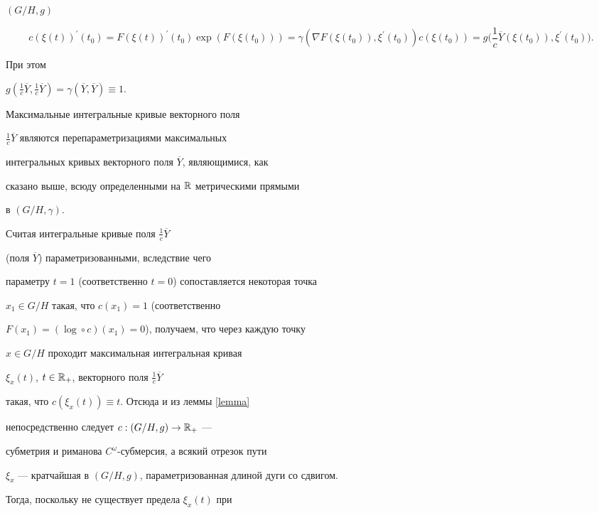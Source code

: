 \begin{pf}
\begin{pf}
$(G/H,g)$


$$


c(\xi(t))^{\prime}(t_{0})=F(\xi(t))^{\prime}(t_{0})\exp(F(\xi(t_{0})))=


\gamma(\nabla F(\xi(t_{0})),\xi^{\prime}(t_{0}))c(\xi(t_{0}))=


g\bigg(\frac{1}{c}\overline{Y}(\xi(t_{0})),\xi^{\prime}(t_{0})\bigg).


$$


При этом


$g(\frac{1}{c}\overline{Y},\frac{1}{c}\overline{Y})=


\gamma(\overline{Y}, \overline{Y})\equiv 1$.


\end{pf}





Максимальные интегральные кривые векторного поля


$\frac{1}{c}\overline{Y}$ являются перепараметризациями максимальных


интегральных кривых векторного поля $\overline{Y}$, являющимися, как


сказано выше, всюду определенными на $\Bbb{R}$ метрическими прямыми


в $(G/H,\gamma)$.


Считая интегральные кривые поля $\frac{1}{c}\overline{Y}$


(поля $\overline{Y}$) параметризованными, вследствие чего


параметру $t=1$ (соответственно $t=0$) сопоставляется некоторая точка


$x_{1}\in G/H$ такая, что $c(x_{1})=1$ (соответственно


$F(x_{1})=(\log\circ{c})(x_{1})=0$), получаем, что через каждую точку


$x\in G/H$ проходит максимальная интегральная кривая


$\xi_{x}(t)$, $t\in \Bbb{R}_{+}$, векторного поля $\frac{1}{c}\overline{Y}$


такая, что $c(\xi_{x}(t))\equiv t$. Отсюда и из леммы \ref{lemma}


непосредственно следует $c:(G/H,g)\rightarrow \Bbb{R}_{+}$ ---


субметрия и риманова $C^{\omega}$-субмерсия, а всякий отрезок пути


$\xi_{x}$ --- кратчайшая в $(G/H,g)$, параметризованная длиной дуги со сдвигом.


Тогда, поскольку не существует предела $\xi_{x}(t)$ при



\end{pf}
